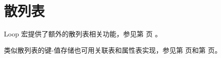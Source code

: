 %
%

\section{散列表} 
Loop 宏提供了额外的散列表相关功能，参见第
\pageref{section:Loop 宏} 页 。

类似散列表的键-值存储也可用关联表和属性表实现，参见第
\pageref{section:关联表} 页和第
\pageref{:property_lists} 页。


